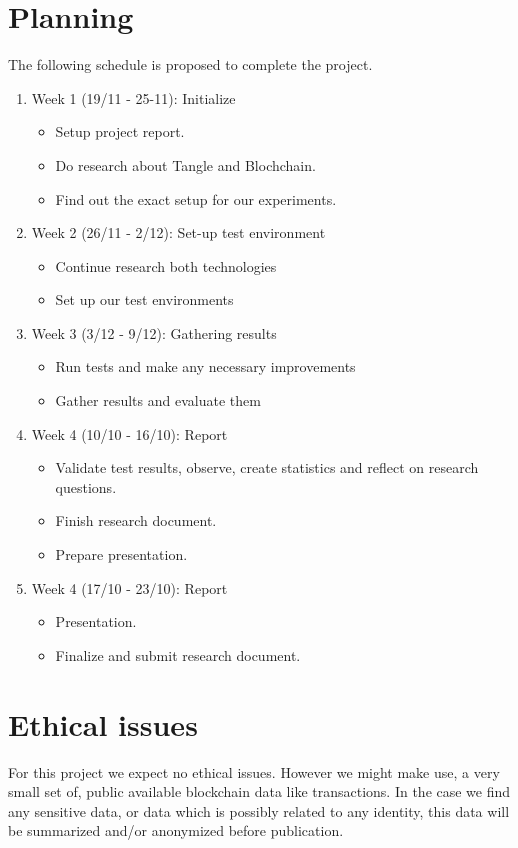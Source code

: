 \documentclass[journal]{IEEEtran}
\begin{document}
\section{Planning}
The following schedule is proposed to complete the project.
\begin{enumerate}
    \itemsep0em
    \item Week 1 (19/11 - 25-11): Initialize
    \begin{itemize}
        \itemsep0em
        \item Setup project report.
        \item Do research about Tangle and Blochchain. 
        \item Find out the exact setup for our experiments.
    \end{itemize}
    \item Week 2 (26/11 - 2/12): Set-up test environment
    \begin{itemize}
        \itemsep0em
        \item Continue research both technologies
        \item Set up our test environments
    \end{itemize}
    \item Week 3 (3/12 - 9/12): Gathering results
    \begin{itemize}
        \itemsep0em
        \item Run tests and make any necessary improvements
        \item Gather results and evaluate them
    \end{itemize}
    \item Week 4 (10/10 - 16/10): Report
    \begin{itemize}
        \itemsep0em
        \item Validate test results, observe, create statistics and reflect on research questions.
        \item Finish research document.
        \item Prepare presentation.
    \end{itemize}
    \item Week 4 (17/10 - 23/10): Report
    \begin{itemize}
        \itemsep0em
        \item Presentation.
        \item Finalize and submit research document.
    \end{itemize}
\end{enumerate}

\section{Ethical issues}
For this project we expect no ethical issues. However we might make use, a very small set of, public available blockchain data like transactions. In the case we find any sensitive data, or data which is possibly related to any identity, this data will be summarized and/or anonymized before publication.

\newpage
\nocite{*}
\printbibliography
\end{document}
